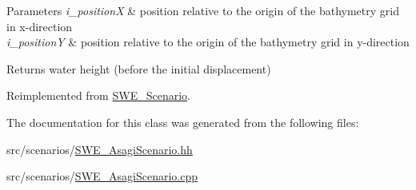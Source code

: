 \begin{DoxyParams}{Parameters}
{\em i\-\_\-position\-X} & position relative to the origin of the bathymetry grid in x-\/direction \\
\hline
{\em i\-\_\-position\-Y} & position relative to the origin of the bathymetry grid in y-\/direction \\
\hline
\end{DoxyParams}
\begin{DoxyReturn}{Returns}
water height (before the initial displacement) 
\end{DoxyReturn}


Reimplemented from \hyperlink{classSWE__Scenario}{S\-W\-E\-\_\-\-Scenario}.



The documentation for this class was generated from the following files\-:\begin{DoxyCompactItemize}
\item 
src/scenarios/\hyperlink{SWE__AsagiScenario_8hh}{S\-W\-E\-\_\-\-Asagi\-Scenario.\-hh}\item 
src/scenarios/\hyperlink{SWE__AsagiScenario_8cpp}{S\-W\-E\-\_\-\-Asagi\-Scenario.\-cpp}\end{DoxyCompactItemize}
